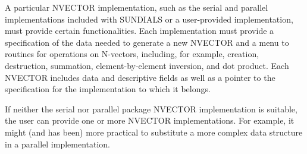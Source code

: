 A particular NVECTOR implementation, such as the serial and parallel 
implementations included with SUNDIALS or a user-provided implementation,
must provide certain functionalities. Each implementation must provide a
specification of the data needed to generate a new NVECTOR and a menu to
routines for operations on N-vectors, including, for example, creation,
destruction, summation, element-by-element inversion, and dot product. Each
NVECTOR includes data and descriptive fields as well as a pointer to the
specification for the implementation to which it belongs.

If neither the serial nor parallel package NVECTOR implementation is
suitable, the user can provide one or more NVECTOR implementations.  For
example, it might (and has been) more practical to substitute a more complex
data structure in a parallel implementation.
